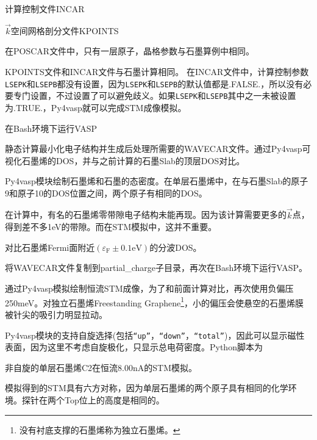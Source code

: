 计算控制文件\textrm{INCAR}

$\vec k$空间网格剖分文件\textrm{KPOINTS}

在\textrm{POSCAR}文件中，只有一层原子，晶格参数与石墨算例中相同。

\textrm{KPOINTS}文件和\textrm{INCAR}文件与石墨计算相同。%
在\textrm{INCAR}文件中，计算控制参数\texttt{LSEPK}和\texttt{LSEPB}都没有设置，因为\texttt{LSEPK}和\texttt{LSEPB}的默认值都是\textrm{.FALSE.}，所以没有必要专门设置，不过设置了可以避免歧义。如果\texttt{LSEPK}和\texttt{LSEPB}其中之一未被设置为\textrm{.TRUE.}，\textrm{Py4vasp}就可以完成\textrm{STM}成像模拟。

在\textrm{Bash}环境下运行\textrm{VASP}

静态计算最小化电子结构并生成后处理所需要的\textrm{WAVECAR}文件。通过\textrm{Py4vasp}可视化石墨烯的\textrm{DOS}，并与之前计算的石墨\textrm{Slab}的顶层\textrm{DOS}对比。%

\textrm{Py4vasp}模块绘制石墨烯和石墨的态密度。在单层石墨烯中，在与石墨\textrm{Slab}的原子9和原子10的\textrm{DOS}位置之间，两个原子有相同的\textrm{DOS}。

在计算中，有名的石墨烯零带隙电子结构未能再现。因为该计算需要更多的$\vec k$点，得到差不多\textrm{1eV}的带隙。而在\textrm{STM}模拟中，这并不重要。

对比石墨烯\textrm{Fermi}面附近$(\varepsilon_{\mathrm{F}}\pm0.1\mathrm{eV})$的分波\textrm{DOS}。

将\textrm{WAVECAR}文件复制到\textrm{partial\_charge}子目录，再次在\textrm{Bash}环境下运行\textrm{VASP}。

通过\textrm{Py4vasp}模拟绘制恒流\textrm{STM}成像，为了和前面计算对比，再次使用负偏压\textrm{250meV}。对独立石墨烯\textrm{Freestanding Graphene}\footnote{没有衬底支撑的石墨烯称为独立石墨烯。}，小的偏压会使悬空的石墨烯膜被针尖的吸引力明显拉动。

\textrm{Py4vasp}模块的支持自旋选择(包括\texttt{``up''}，\texttt{``down''}，\texttt{``total''})，因此可以显示磁性表面，因为这里不考虑自旋极化，只显示总电荷密度。\textrm{Python}脚本为

非自旋的单层石墨烯\textrm{C2}在恒流\textrm{8.00nA}的\textrm{STM}模拟。

模拟得到的\textrm{STM}具有六方对称，因为单层石墨烯的两个原子具有相同的化学环境。探针在两个\textrm{Top}位上的高度是相同的。

